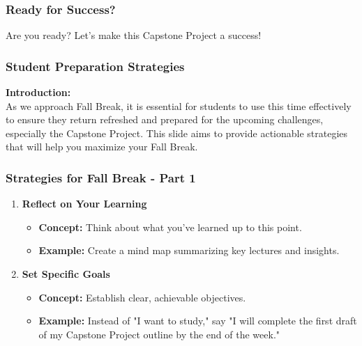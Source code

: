 \documentclass[aspectratio=169]{beamer}
\begin{document}
\begin{frame}
    \frametitle{Ready for Success?}
    Are you ready? Let’s make this Capstone Project a success!
\end{frame}

\begin{frame}[fragile]
    \frametitle{Student Preparation Strategies}
    \textbf{Introduction:} \\
    As we approach Fall Break, it is essential for students to use this time effectively to ensure they return refreshed and prepared for the upcoming challenges, especially the Capstone Project. This slide aims to provide actionable strategies that will help you maximize your Fall Break.
\end{frame}

\begin{frame}[fragile]
    \frametitle{Strategies for Fall Break - Part 1}
    \begin{enumerate}
        \item \textbf{Reflect on Your Learning}
            \begin{itemize}
                \item \textbf{Concept:} Think about what you’ve learned up to this point.
                \item \textbf{Example:} Create a mind map summarizing key lectures and insights.
            \end{itemize}

        \item \textbf{Set Specific Goals}
            \begin{itemize}
                \item \textbf{Concept:} Establish clear, achievable objectives.
                \item \textbf{Example:} Instead of "I want to study," say "I will complete the first draft of my Capstone Project outline by the end of the week."
            \end{itemize}
    \end{enumerate}
\end{frame}
\end{document}
